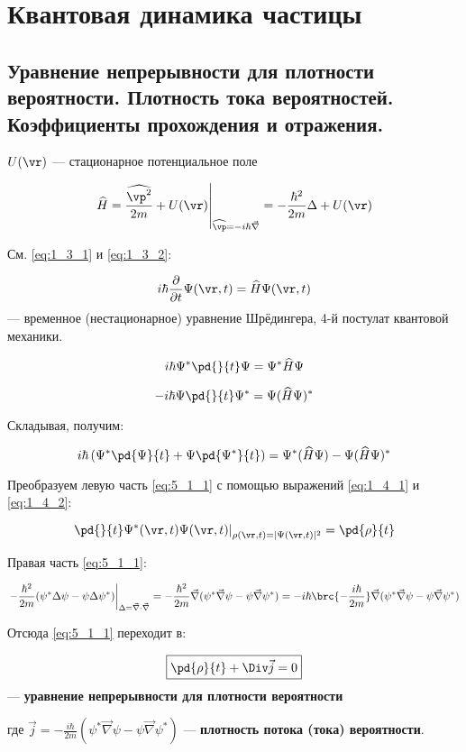 \chapter{Квантовая динамика частицы}

\section{Уравнение непрерывности для плотности вероятности. Плотность тока вероятностей. Коэффициенты прохождения и отражения.}

$U(\vr)$ --- стационарное потенциальное поле

$$\left. \widehat{H}=\frac{\widehat{\vp^2}}{2m}+U(\vr) \right|_{\widehat{\vp}=-i\hbar\vec{\nabla}} =-\frac{\hbar^2}{2m}\Delta+U(\vr)$$

См. \eqref{eq:1_3_1} и \eqref{eq:1_3_2}:

$$i\hbar\frac{\partial}{\partial{t}}\Psi(\vr,t)=\widehat{H}\Psi(\vr,t)$$
--- временное (нестационарное) уравнение Шрёдингера, 4-й постулат квантовой механики.

$$i\hbar\Psi^*\pd{}{t}\Psi=\Psi^*\widehat{H}\Psi$$

$$-i\hbar\Psi\pd{}{t}\Psi^*=\Psi(\widehat{H}\Psi)^*$$

Складывая, получим:

\begin{equation}
\label{eq:5_1_1}
i\hbar\left(\Psi^*\pd{\Psi}{t}+\Psi\pd{\Psi^*}{t}\right)=\Psi^*(\widehat{H}\Psi)-\Psi(\widehat{H}\Psi)^*
\end{equation}

Преобразуем левую часть \eqref{eq:5_1_1} с помощью выражений \eqref{eq:1_4_1} и \eqref{eq:1_4_2}:

$$\left.\pd{}{t}\Psi^*(\vr,t)\Psi(\vr,t)\right|_{\rho(\vr,t)=|\Psi(\vr,t)|^2} =\pd{\rho}{t}$$


Правая часть \eqref{eq:5_1_1}: 

$$\left. -\frac{\hbar^2}{2m}(\psi^*\Delta\psi-\psi\Delta\psi^*)\right|_{\Delta=\vec{\nabla}\cdot\vec{\nabla}} =-\frac{\hbar^2}{2m}\vec{\nabla}(\psi^*\vec{\nabla}\psi-\psi\vec{\nabla}\psi^*) = -i\hbar \brc{-\frac{i\hbar}{2m}}\vec{\nabla}(\psi^*\vec{\nabla}\psi-\psi\vec{\nabla}\psi^*)$$

Отсюда \eqref{eq:5_1_1} переходит в:

$$\boxed{\pd{\rho}{t}+\Div\vec{j}=0}$$ --- \textbf{уравнение непрерывности для плотности вероятности}

где $\boxed{\vec{j}=-\frac{i\hbar}{2m}(\psi^*\vec{\nabla}\psi-\psi\vec{\nabla}\psi^*)}$ --- \textbf{плотность потока (тока) вероятности}.

